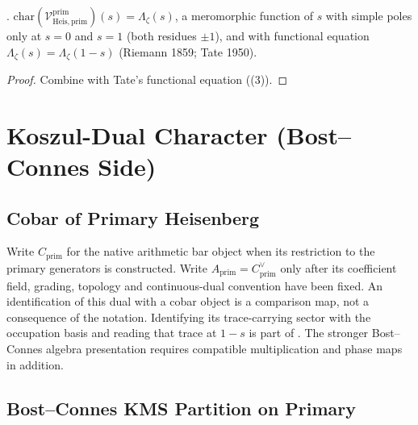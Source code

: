 \begin{corollary}
\label{v4-arith:prim-zeta:cor:primary-is-xi}
\ClaimStatusProvedHere.
\(\mathrm{char}(\mathcal{V}^{\mathrm{prim}}_{\mathrm{Heis},\mathrm{prim}})(s)=\Lambda_{\zeta}(s)\),
a meromorphic function of \(s\) with simple poles only at \(s=0\) and
\(s=1\) (both residues \(\pm 1\)), and with functional equation
\(\Lambda_{\zeta}(s)=\Lambda_{\zeta}(1-s)\) (Riemann 1859; Tate 1950).
\end{corollary}

\begin{proof}
Combine  with Tate's
functional equation
((3)).
\end{proof}

\section{Koszul-Dual Character (Bost--Connes Side)}
\label{v4-arith:prim-zeta:koszul-dual-char}

\subsection{Cobar of Primary Heisenberg}
\label{v4-arith:prim-zeta:cobar-primary}

\begin{definition}
\label{v4-arith:prim-zeta:def:cobar-primary}
Write \(C_{\mathrm{prim}}\) for the native arithmetic bar object when
its restriction to the primary generators is constructed. Write
\(A_{\mathrm{prim}}=C_{\mathrm{prim}}^\vee\) only after its coefficient
field, grading, topology and continuous-dual convention have been fixed.
An identification of this dual with a cobar object is a comparison map,
not a consequence of the notation. Identifying its trace-carrying sector
with the occupation basis and reading that trace at \(1-s\) is part of
. The stronger
Bost--Connes algebra presentation requires compatible multiplication
and phase maps in addition.
\end{definition}

\subsection{Bost--Connes KMS Partition on Primary}
\label{v4-arith:prim-zeta:BC-KMS}

